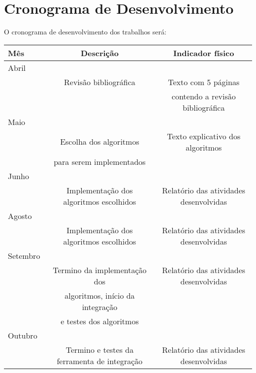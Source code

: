 \chapter{Cronograma de Desenvolvimento}

O cronograma de desenvolvimento dos trabalhos será:

\begin{table}[h]
  \begin{center}
    \begin{tabular}{|l|c|c|}
      \hline
        Mês & Descrição & Indicador físico \\
      \hline
        Abril & &  \\
             & Revisão bibliográfica & Texto com 5 páginas\\
             & & contendo a revisão bibliográfica \\
      \hline
        Maio & &  \\
          & Escolha dos algoritmos  & Texto explicativo dos algoritmos \\
          & para serem implementados & \\
      \hline
        Junho & & \\
                                 &Implementação dos algoritmos escolhidos & Relatório das atividades desenvolvidas\\
      \hline
        Agosto & &\\
                                 &Implementação dos
                                 algoritmos escolhidos & Relatório das atividades desenvolvidas \\
      \hline
        Setembro & &\\
                                 &Termino da implementação dos & Relatório das atividades desenvolvidas \\
                                &algoritmos, início da integração \\
                                &e testes dos algoritmos\\
      \hline
        Outubro & & \\
                                         &Termino e testes da ferramenta de integração  & Relatório das atividades desenvolvidas \\
      \hline
    \end{tabular}
    \label{tab:cronograma_trabalho}
  \end{center}
\end{table}